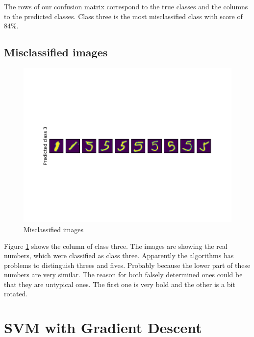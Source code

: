 \documentclass{article}
\begin{document}
The rows of our confusion matrix correspond to the true classes and the columns to the predicted classes. Class three is the most misclassified class with score of 84\%. 

\newpage

\subsection{Misclassified images}

\begin{figure}[!ht]
	\centering
	\includegraphics[width=\textwidth]{./Figures/3b_misclassifieditems.pdf}
	\caption{Misclassified images}
	\label{mnist_misclassified}
\end{figure}

Figure \ref{mnist_misclassified} shows the column of class three. The images are showing the real numbers, which were classified as class three. Apparently the algorithms has problems to distinguish threes and fives. Probably because the lower part of these numbers are very similar. The reason for both falsely determined ones could be that they are untypical ones. The first one is very bold and the other is a bit rotated.


\section{SVM with Gradient Descent}

\subsection{}

\subsection{}

\subsection{}

\subsection{}
\end{document}
